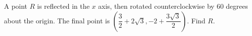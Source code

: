 A point $R$ is reflected in the $x$ axis, then rotated counterclockwise by 60 degrees about the origin. The final point is $(\dfrac{3}{2}+2\sqrt3,-2+\dfrac{3\sqrt3}{2})$. Find $R$.
